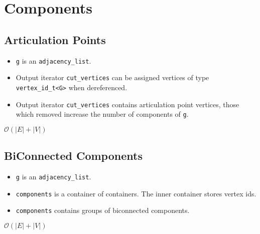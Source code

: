 \section{Components}
\subsection{Articulation Points}
{\small
     
}
\begin{itemdescr}
      \pnum\preconditions
      \begin{itemize}
            \item
              \lstinline{g} is an \lstinline{adjacency_list}.
            \item
              Output iterator \lstinline{cut_vertices} can be assigned vertices of type \lstinline{vertex_id_t<G>} when dereferenced.
      \end{itemize}
      \pnum\effects
      \begin{itemize}
            \item
            Output iterator \lstinline{cut_vertices} contains articulation point vertices, those which removed increase the number of components of \lstinline{g}.
      \end{itemize}

      \pnum\complexity $\mathcal{O}(|E|+|V|)$
\end{itemdescr}

\subsection{BiConnected Components}
{\small
     
}
\begin{itemdescr}
      \pnum\preconditions
      \begin{itemize}
            \item
              \lstinline{g} is an \lstinline{adjacency_list}.
            \item
              \lstinline{components} is a container of containers. The inner container stores vertex ids.
      \end{itemize}
      \pnum\effects
      \begin{itemize}
            \item
            \lstinline{components} contains groups of biconnected components.
      \end{itemize}

      \pnum\complexity $\mathcal{O}(|E|+|V|)$
\end{itemdescr}

